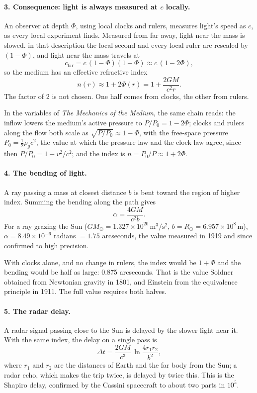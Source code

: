 \paragraph{3. Consequence: light is always measured at $c$ locally.} An observer at depth $\Phi$, using local clocks and rulers, measures light's speed as $c$, as every local experiment finds. Measured from far away, light near the mass is slowed.  in that description the local second and every local ruler are rescaled by $(1-\Phi)$, and light near the mass travels at
\[
c_{\text{far}} = c\,(1-\Phi)(1-\Phi) \approx c\,(1-2\Phi),
\]
so the medium has an effective refractive index
\[
n(r) \approx 1 + 2\Phi(r) = 1 + \frac{2GM}{c^2 r}.
\]
The factor of 2 is not chosen. One half comes from clocks, the other from rulers.

In the variables of \emph{The Mechanics of the Medium}, the same chain reads: the inflow lowers the medium's active pressure to $P/P_0 = 1 - 2\Phi$; clocks and rulers along the flow both scale as $\sqrt{P/P_0} \approx 1 - \Phi$, with the free-space pressure $P_0 = \tfrac12\rho_g c^2$, the value at which the pressure law and the clock law agree, since then $P/P_0 = 1 - v^2/c^2$; and the index is $n = P_0/P \approx 1 + 2\Phi$.

\paragraph{4. The bending of light.} A ray passing a mass at closest distance $b$ is bent toward the region of higher index. Summing the bending along the path gives
\[
\alpha = \frac{4GM}{c^2 b}.
\]
For a ray grazing the Sun ($GM_\odot = 1.327\times10^{20}\,\mathrm{m^3/s^2}$, $b = R_\odot = 6.957\times10^{8}$\,m), $\alpha = 8.49\times10^{-6}$ radians $= 1.75$ arcseconds, the value measured in 1919 and since confirmed to high precision.

With clocks alone, and no change in rulers, the index would be $1 + \Phi$ and the bending would be half as large: 0.875 arcseconds. That is the value Soldner obtained from Newtonian gravity in 1801, and Einstein from the equivalence principle in 1911. The full value requires both halves.

\paragraph{5. The radar delay.} A radar signal passing close to the Sun is delayed by the slower light near it. With the same index, the delay on a single pass is
\[
\Delta t = \frac{2GM}{c^3}\,\ln\!\frac{4 r_1 r_2}{b^2},
\]
where $r_1$ and $r_2$ are the distances of Earth and the far body from the Sun; a radar echo, which makes the trip twice, is delayed by twice this. This is the Shapiro delay, confirmed by the Cassini spacecraft to about two parts in $10^{5}$.

